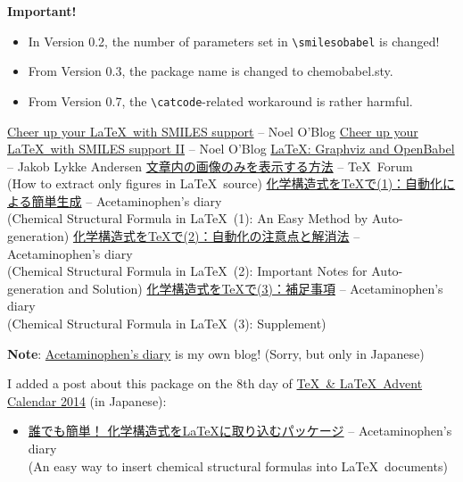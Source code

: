 \documentclass[dvipdfmx,12pt]{jsarticle}
\begin{document}
\textbf{Important!}
\begin{itemize}
\item In Version 0.2, the number of parameters set in \verb|\smilesobabel| is changed!
\item From Version 0.3, the package name is changed to \textsf{chemobabel.sty}.
\item From Version 0.7, the \verb|\catcode|-related workaround is rather harmful.
\end{itemize}

\clearpage

\begin{thebibliography}{9}
\href{http://baoilleach.blogspot.jp/2012/03/cheer-up-your-latex-with-smiles-support.html}{Cheer up your \LaTeX\ with SMILES support} -- Noel O'Blog
\href{http://baoilleach.blogspot.jp/2012/04/cheer-up-your-latex-with-smiles-support.html}{Cheer up your \LaTeX\ with SMILES support II} -- Noel O'Blog
\href{http://imada.sdu.dk/~jlandersen/}{\LaTeX: Graphviz and OpenBabel} -- Jakob Lykke Andersen
\href{http://oku.edu.mie-u.ac.jp/tex/mod/forum/discuss.php?d=1411}{文章内の画像のみを表示する方法} -- \TeX\ Forum \\
(How to extract only figures in \LaTeX\ source)
\href{http://acetaminophen.hatenablog.com/entry/2014/11/02/130624}{化学構造式を\TeX で(1)：自動化による簡単生成} -- Acetaminophen's diary \\
(Chemical Structural Formula in \LaTeX\ (1): An Easy Method by Auto-generation)
\href{http://acetaminophen.hatenablog.com/entry/2014/11/02/130624}{化学構造式を\TeX で(2)：自動化の注意点と解消法} -- Acetaminophen's diary \\
(Chemical Structural Formula in \LaTeX\ (2): Important Notes for Auto-generation and Solution)
\href{http://acetaminophen.hatenablog.com/entry/2014/11/05/135927}{化学構造式を\TeX で(3)：補足事項} -- Acetaminophen's diary \\
(Chemical Structural Formula in \LaTeX\ (3): Supplement)
\end{thebibliography}

\noindent
\textbf{Note}: \href{http://acetaminophen.hatenablog.com/}{Acetaminophen's diary} is my own blog! (Sorry, but only in Japanese)

I added a post about this package on the 8th day of \href{http://www.adventar.org/calendars/553}{\TeX\ \& \LaTeX\ Advent Calendar 2014} (in Japanese):
\begin{itemize}
\item \href{http://acetaminophen.hatenablog.com/entry/2014/12/08/053519}{誰でも簡単！ 化学構造式を\LaTeX に取り込むパッケージ} -- Acetaminophen's diary \\
(An easy way to insert chemical structural formulas into \LaTeX\ documents)
\end{itemize}
\end{document}
